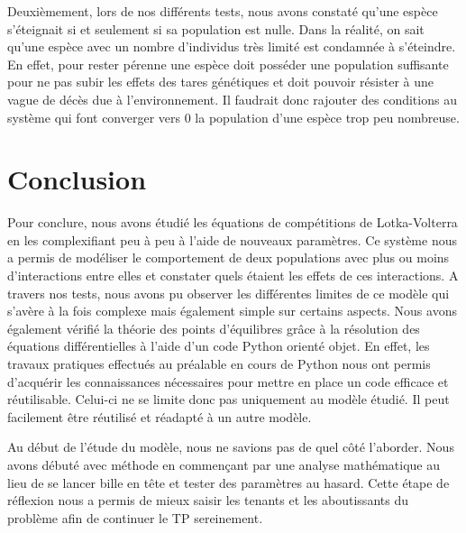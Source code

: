 \documentclass[11pt]{article}
\begin{document}
Deuxièmement, lors de nos différents tests, nous avons constaté qu'une espèce s'éteignait si et seulement si sa population est nulle. Dans la réalité, on sait qu'une espèce avec un nombre d'individus très limité est condamnée à s'éteindre. En effet, pour rester pérenne une espèce doit posséder une population suffisante pour ne pas subir les effets des tares génétiques et doit pouvoir résister à une vague de décès due à l'environnement. Il faudrait donc rajouter des conditions au système qui font converger vers 0 la population d'une espèce trop peu nombreuse.


\section{Conclusion}
Pour conclure, nous avons étudié les équations de compétitions de Lotka-Volterra en les complexifiant peu à peu à l'aide de nouveaux paramètres. Ce système nous a permis de modéliser le comportement  de deux populations avec plus ou moins d'interactions entre elles et constater quels étaient les effets de ces interactions. A travers nos tests, nous avons pu observer les différentes limites de ce modèle qui s'avère à la fois complexe mais également simple sur certains aspects.
Nous avons également vérifié la théorie des points d'équilibres grâce à la résolution des équations différentielles à l'aide d'un code Python orienté objet. En effet, les travaux pratiques effectués au préalable en cours de Python nous ont permis d'acquérir les connaissances nécessaires pour mettre en place un code efficace et réutilisable. Celui-ci ne se limite donc pas uniquement au modèle étudié. Il peut facilement être réutilisé et réadapté à un autre modèle.

Au début de l'étude du modèle, nous ne savions pas de quel côté l'aborder. Nous avons débuté avec méthode en commençant par une analyse mathématique au lieu de se lancer bille en tête et tester des paramètres au hasard. Cette étape de réflexion nous a permis de mieux saisir les tenants et les aboutissants du problème afin de continuer le TP sereinement.
\end{document}
